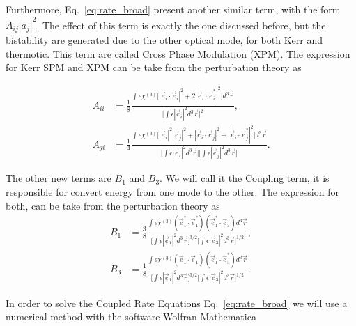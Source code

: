Furthermore, Eq.~\ref{eq:rate_broad} present another similar term, with the form $A_{ij}|a_j|^2$. The effect of this term is exactly the one discussed before, but the bistability are generated due to the other optical mode, for both Kerr and thermotic. This term are called Cross Phase Modulation (XPM). The expression for Kerr SPM and XPM can be take from the perturbation theory as 


\begin{subequations}
    \begin{alignat}{1}
        A_{ii} &= \frac{1}{8}\frac{\int\epsilon\chi^{(3)}
        \Big[|\vec{e}_i\cdot\vec{e}_i|^2 + 2|\vec{e}_i\cdot\vec{e}_i^*|^2
        \Big]d^3\vec{r}}{\Big[\int \epsilon|\vec{e}_i|^2 d^3\vec{r}\Big]^2},
        \\
        A_{ji} &= \frac{1}{4}\frac{\int\epsilon\chi^{(3)}
        \Big[|\vec{e}_i|^2|\vec{e}_j|^2 + |\vec{e}_i\cdot\vec{e}_j|^2+ |\vec{e}_i\cdot\vec{e}_j^*|^2
        \Big]d^3\vec{r}}{\Big[\int \epsilon|\vec{e}_i|^2 d^3\vec{r}\Big]\Big[\int \epsilon|\vec{e}_j|^2 d^3\vec{r}\Big]}.
    \end{alignat}
\end{subequations}

The other new terms are $B_1$ and $B_3$.%
We will call it the Coupling term, it is responsible for convert energy from one mode to the other. The expression for both, can be take from the perturbation theory as
\begin{subequations}
    \begin{alignat}{1}
        B_{1} &= \frac{3}{8}\frac{\int\epsilon\chi^{(3)}
        (\vec{e}_1^*\cdot\vec{e}_1^*)(\vec{e}_1^*\cdot\vec{e}_3)
        d^3\vec{r}}{\Big[\int \epsilon|\vec{e}_1|^2 d^3\vec{r}\Big]^{3/2}\Big[\int \epsilon|\vec{e}_3|^2 d^3\vec{r}\Big]^{1/2}},
        \label{eq:coupling_b1}
        \\
        B_{3} &= \frac{1}{8}\frac{\int\epsilon\chi^{(3)}
        (\vec{e}_1\cdot\vec{e}_1)(\vec{e}_1\cdot\vec{e}^*_3)
        d^3\vec{r}}{\Big[\int \epsilon|\vec{e}_1|^2 d^3\vec{r}\Big]^{3/2}\Big[\int \epsilon|\vec{e}_3|^2 d^3\vec{r}\Big]^{1/2}}.
        \label{eq:coupling_b3}
    \end{alignat}
    \label{eq:coupling}
\end{subequations}

In order to solve the Coupled Rate Equations Eq.~\ref{eq:rate_broad} we will use a numerical method with the software Wolfran Mathematica~\regmark

